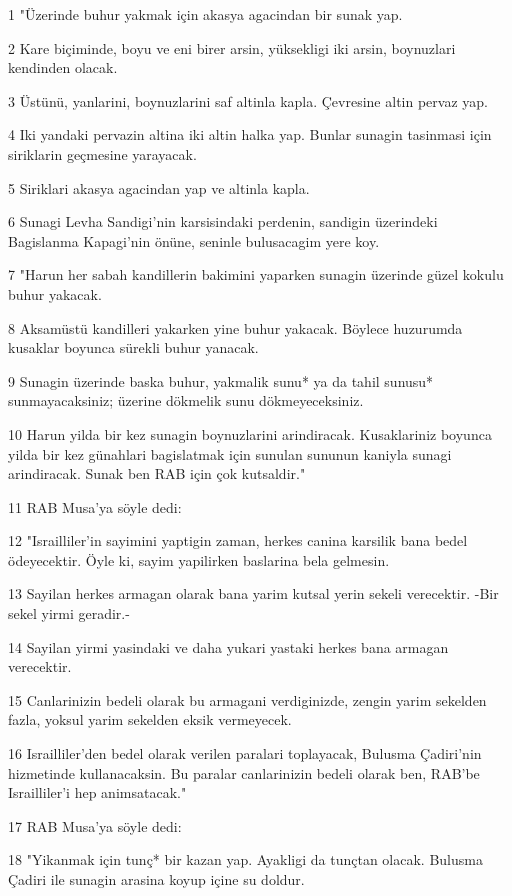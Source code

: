 \par 1 "Üzerinde buhur yakmak için akasya agacindan bir sunak yap.
\par 2 Kare biçiminde, boyu ve eni birer arsin, yüksekligi iki arsin, boynuzlari kendinden olacak.
\par 3 Üstünü, yanlarini, boynuzlarini saf altinla kapla. Çevresine altin pervaz yap.
\par 4 Iki yandaki pervazin altina iki altin halka yap. Bunlar sunagin tasinmasi için siriklarin geçmesine yarayacak.
\par 5 Siriklari akasya agacindan yap ve altinla kapla.
\par 6 Sunagi Levha Sandigi'nin karsisindaki perdenin, sandigin üzerindeki Bagislanma Kapagi'nin önüne, seninle bulusacagim yere koy.
\par 7 "Harun her sabah kandillerin bakimini yaparken sunagin üzerinde güzel kokulu buhur yakacak.
\par 8 Aksamüstü kandilleri yakarken yine buhur yakacak. Böylece huzurumda kusaklar boyunca sürekli buhur yanacak.
\par 9 Sunagin üzerinde baska buhur, yakmalik sunu* ya da tahil sunusu* sunmayacaksiniz; üzerine dökmelik sunu dökmeyeceksiniz.
\par 10 Harun yilda bir kez sunagin boynuzlarini arindiracak. Kusaklariniz boyunca yilda bir kez günahlari bagislatmak için sunulan sununun kaniyla sunagi arindiracak. Sunak ben RAB için çok kutsaldir."
\par 11 RAB Musa'ya söyle dedi:
\par 12 "Israilliler'in sayimini yaptigin zaman, herkes canina karsilik bana bedel ödeyecektir. Öyle ki, sayim yapilirken baslarina bela gelmesin.
\par 13 Sayilan herkes armagan olarak bana yarim kutsal yerin sekeli verecektir. -Bir sekel yirmi geradir.-
\par 14 Sayilan yirmi yasindaki ve daha yukari yastaki herkes bana armagan verecektir.
\par 15 Canlarinizin bedeli olarak bu armagani verdiginizde, zengin yarim sekelden fazla, yoksul yarim sekelden eksik vermeyecek.
\par 16 Israilliler'den bedel olarak verilen paralari toplayacak, Bulusma Çadiri'nin hizmetinde kullanacaksin. Bu paralar canlarinizin bedeli olarak ben, RAB'be Israilliler'i hep animsatacak."
\par 17 RAB Musa'ya söyle dedi:
\par 18 "Yikanmak için tunç* bir kazan yap. Ayakligi da tunçtan olacak. Bulusma Çadiri ile sunagin arasina koyup içine su doldur.
